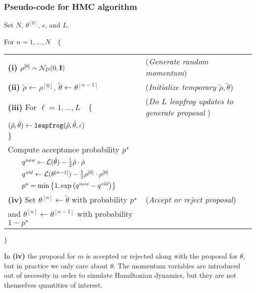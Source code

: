 \subsubsection{Pseudo-code for HMC algorithm}


\noindent Set $N$, $\theta^{[0]}$, $\epsilon$, and $L$.

\noindent For $n = 1, \dots, N \quad \{$ 

\begin{tabular}{ll}
{\bf (i)} $\rho^{[0]} \sim \mathcal{N}_D(0, \mathbf{I})$ & ({\it Generate random momentum}) \\

{\bf (ii)} $\tilde{\rho} \leftarrow \rho^{[0]}$, $\tilde{\theta} \leftarrow \theta^{[n-1]}$ &  ({\it Initialize temporary $\tilde{\rho}, \tilde{\theta}$})\\

{\bf (iii)} For $\ell = 1, \dots, L \quad \{$  & ({\it Do $L$ leapfrog updates to generate proposal }) \\[-8pt]

\qquad $(\tilde{\rho}, \tilde{\theta}) \leftarrow {\tt leapfrog}(\tilde{\rho}, \tilde{\theta}, \epsilon)$ & \\[-8pt]
\quad $\}$ & \\

\quad Compute acceptance probability $p^\star$  & \\[-8pt]
$\qquad  q^{\it new} \leftarrow  \mathcal{L}(\tilde{\theta}) - \tfrac{1}{2} \tilde{\rho} \cdot \tilde{\rho} $ & \\[-8pt]
$ \qquad q^{\it old} \leftarrow   \mathcal{L}(\theta^{[n-1]} ) -  \tfrac{1}{2} \rho^{[0]} \cdot \rho^{[0]} $ & \\[-8pt]
$ \qquad p^\star = \min{\left\{1, \exp{\left( q^{\it new} - q^{\it old} \right)} \right\}} $& \\[3pt]

{\bf (iv)} Set $\theta^{[n]} \leftarrow \tilde{\theta}$ with probability $p^\star$  & ({\it Accept or reject proposal})\\
\qquad and $\theta^{[n]} \leftarrow \theta^{[n-1]}$ with probability $ 1 - p^\star$ & \\

\end{tabular}

\noindent $\}$

In {\bf (iv)} the proposal for $m$ is accepted or rejected along with the proposal for 
$\theta$, but in practice we only care about $\theta$. The momentum variables are 
introduced out of necessity in order to simulate Hamiltonian dynamics, but they are 
not themselves quantities of interest.

